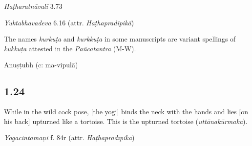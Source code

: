 \begin{ekdosis}
\begin{testimonia}[hp01_023]
\emph{Haṭharatnāvalī} 3.73

\begin{versinnote}
\end{versinnote}

\emph{Yuktabhavadeva} 6.16 (attr. \emph{Haṭhapradīpikā})

\begin{versinnote}
\end{versinnote}


\end{testimonia}

\begin{philcomm}[hp01_023]
The names \emph{kurkuṭa} and \emph{kurkkuṭa} in some manuscripts are variant spellings of \emph{kukkuṭa} attested in the \emph{Pañcatantra} (M-W).
\end{philcomm}

\begin{metre}[hp01_023]
Anuṣṭubh (c: ma-vipulā)
\end{metre}

\subsection*{1.24}
\begin{translation}[hp01_024]
While in the wild cock pose, [the yogi] binds the neck with the hands and lies [on his back] upturned like a tortoise. This is the upturned tortoise (\emph{uttānakūrmaka}).
\end{translation}

\begin{testimonia}[hp01_024]
\emph{Yogacintāmaṇi} f. 84r (attr. \emph{Haṭhapradīpikā})

\begin{versinnote}
\end{versinnote}


\end{testimonia}
\end{ekdosis}
